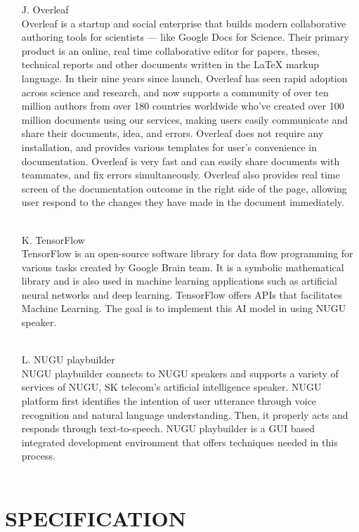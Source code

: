 \documentclass[conference]{IEEEtran}
\begin{document}
\begin{itemize}
\item [J.] Overleaf\\
Overleaf is a startup and social enterprise that builds modern collaborative authoring tools for scientists — like Google Docs for Science. Their primary product is an online, real time collaborative editor for papers, theses, technical reports and other documents written in the LaTeX markup language.
In their nine years since launch, Overleaf has seen rapid adoption across science and research, and now supports a community of over ten million authors from over 180 countries worldwide who’ve created over 100 million documents using our services, making users easily communicate and share their documents, idea, and errors. Overleaf does not require any installation, and provides various templates for user's convenience in documentation. Overleaf is very fast and can easily share documents with teammates, and fix errors simultaneously. Overleaf also provides real time screen of the documentation outcome in the right side of the page, allowing user respond to the changes they have made in the document immediately.\\
\\
\item [K.] TensorFlow\\
TensorFlow is an open-source software library for data flow programming for various tasks created by Google Brain team. It is a symbolic mathematical library and is also used in machine learning applications such as artificial neural networks and deep learning. TensorFlow offers APIs that facilitates Machine Learning. The goal is to implement this AI model in using NUGU speaker.\\
\\
\item [L.] NUGU playbuilder\\
NUGU playbuilder connects to NUGU speakers and supports a variety of services of NUGU, SK telecom’s artificial intelligence speaker. NUGU platform first identifies the intention of user utterance through voice recognition and natural language understanding. Then, it properly acts and responds through text-to-speech. NUGU playbuilder is a GUI based integrated development environment that offers techniques needed in this process.\\
\\
\end{itemize}

\section{SPECIFICATION}
\end{document}
